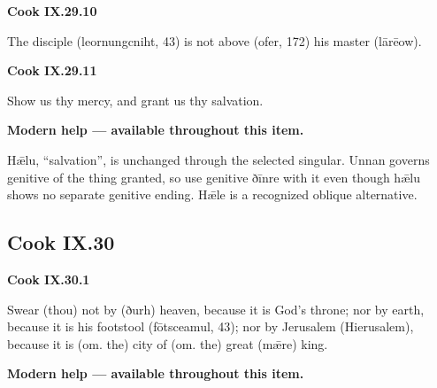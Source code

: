 \par\begin{minipage}{\linewidth}\raggedright
\textbf{Cook IX.29.10}

The disciple (leornungcniht, 43) is not above (ofer, 172) his master (lārēow).

\end{minipage}\par\addvspace{4pt}

\par\begin{minipage}{\linewidth}\raggedright
\textbf{Cook IX.29.11}

Show us thy mercy, and grant us thy salvation.

\textbf{Modern help — available throughout this item.}

\end{minipage}\par\addvspace{4pt}

Hǣlu, “salvation”, is unchanged through the selected singular. Unnan governs genitive of the thing granted, so use genitive ðīnre with it even though hǣlu shows no separate genitive ending. Hǣle is a recognized oblique alternative.

\subsection*{Cook IX.30}

\par\begin{minipage}{\linewidth}\raggedright
\textbf{Cook IX.30.1}

Swear (thou) not by (ðurh) heaven, because it is God’s throne; nor by earth, because it is his footstool (fōtsceamul, 43); nor by Jerusalem (Hierusalem), because it is (om. the) city of (om. the) great (mǣre) king.

\textbf{Modern help — available throughout this item.}

\end{minipage}\par\addvspace{4pt}

